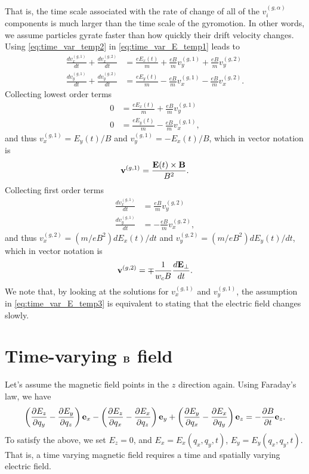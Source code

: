 \documentclass[a4paper,11pt]{report}
\begin{document}
That is, the time scale associated with the rate of change of all of the $v^{(g,\alpha)}_i$ components is much larger than the time scale of the gyromotion. In other words, we assume particles gyrate faster than how quickly their drift velocity changes. Using \cref{eq:time_var_temp2} in \cref{eq:time_var_E_temp1} leads to
\begin{align}
    \frac{dv_x^{(g,1)}}{dt} + \frac{dv_x^{(g,2)}}{dt} &= \frac{e E_x(t)}{m} + \frac{eB}{m} v_y^{(g,1)} + \frac{eB}{m} v_y^{(g,2)} \nonumber \\
    \frac{dv_y^{(g,1)}}{dt} + \frac{dv_y^{(g,2)}}{dt} &= \frac{e E_y(t)}{m} - \frac{eB}{m} v_x^{(g,1)} - \frac{eB}{m} v_x^{(g,2)}.
\end{align}
Collecting lowest order terms
\begin{align}
    0 &= \frac{eE_x(t)}{m} + \frac{eB}{m} v_y^{(g,1)}  \nonumber \\
    0 &= \frac{eE_y(t)}{m} - \frac{eB}{m} v_x^{(g,1)} ,
\end{align}
and thus $v^{(g,1)}_x = E_y(t) / B$ and $v^{(g,1)}_y = -E_x(t) / B$, which in vector notation is
\begin{equation}
    \mathbf{v}^{(g,1)} = \frac{\mathbf{E}(t) \times \mathbf{B}}{B^2}.
\end{equation}
Collecting first order terms 
\begin{align}
    \frac{dv_x^{(g,1)}}{dt} &= \frac{eB}{m} v_y^{(g,2)} \nonumber \\
    \frac{dv_y^{(g,1)}}{dt} &= -\frac{eB}{m} v_x^{(g,2)},
\end{align}
and thus $v_x^{(g,2)} = (m/eB^2)dE_x(t)/dt$ and $v_y^{(g,2)} = (m/eB^2) dE_y(t)/dt$, which in vector notation is
\begin{equation}
    \label{eq:particle_polarization_drift}
    \mathbf{v}^{(g,2)} = \mp \frac{1}{w_c B}\frac{d\mathbf{E}_\perp}{dt}.
\end{equation}
We note that, by looking at the solutions for $v_x^{(g,1)}$ and $v_y^{(g,1)}$, the assumption in \cref{eq:time_var_E_temp3} is equivalent to stating that the electric field changes slowly. 

\section{Time-varying $\mathbf{B}$ field}
Let's assume the magnetic field points in the $z$ direction again. Using Faraday's law, we have
\begin{equation}
    \left(\frac{\partial E_z}{\partial q_y} - \frac{\partial E_y}{\partial q_z} \right) \mathbf{e}_x - \left(\frac{\partial E_z}{\partial q_x} - \frac{\partial E_x}{\partial q_z} \right) \mathbf{e}_y + \left(\frac{\partial E_y}{\partial q_x} - \frac{\partial E_x}{\partial q_y} \right) \mathbf{e}_z = -\frac{\partial B}{\partial t} \mathbf{e}_z.
\end{equation}
To satisfy the above, we set $E_z = 0$, and $E_x = E_x(q_x,q_y,t)$, $E_y = E_y(q_x,q_y,t)$. That is, a time varying magnetic field requires a time and spatially varying electric field. 
\end{document}
